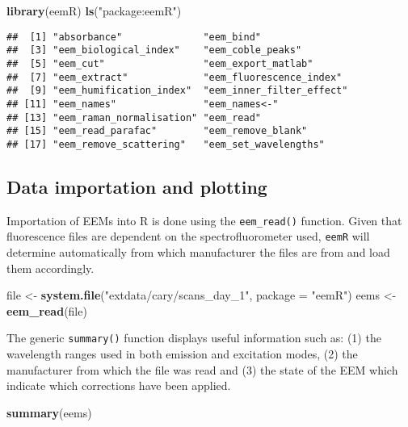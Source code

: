 \documentclass[]{book}
\newenvironment{Shaded}{\begin{snugshade}}{\end{snugshade}}
\newcommand{\KeywordTok}[1]{\textcolor[rgb]{0.13,0.29,0.53}{\textbf{{#1}}}}
\newcommand{\DataTypeTok}[1]{\textcolor[rgb]{0.13,0.29,0.53}{{#1}}}
\newcommand{\StringTok}[1]{\textcolor[rgb]{0.31,0.60,0.02}{{#1}}}
\newcommand{\NormalTok}[1]{{#1}}
\begin{document}
\begin{Shaded}
\begin{Highlighting}[]
\KeywordTok{library}\NormalTok{(eemR)}
\KeywordTok{ls}\NormalTok{(}\StringTok{"package:eemR"}\NormalTok{)}
\end{Highlighting}
\end{Shaded}

\begin{verbatim}
##  [1] "absorbance"              "eem_bind"               
##  [3] "eem_biological_index"    "eem_coble_peaks"        
##  [5] "eem_cut"                 "eem_export_matlab"      
##  [7] "eem_extract"             "eem_fluorescence_index" 
##  [9] "eem_humification_index"  "eem_inner_filter_effect"
## [11] "eem_names"               "eem_names<-"            
## [13] "eem_raman_normalisation" "eem_read"               
## [15] "eem_read_parafac"        "eem_remove_blank"       
## [17] "eem_remove_scattering"   "eem_set_wavelengths"
\end{verbatim}

\subsection{Data importation and
plotting}\label{data-importation-and-plotting}

Importation of EEMs into R is done using the \texttt{eem\_read()}
function. Given that fluorescence files are dependent on the
spectrofluorometer used, \texttt{eemR} will determine automatically from
which manufacturer the files are from and load them accordingly.

\begin{Shaded}
\begin{Highlighting}[]
\NormalTok{file <-}\StringTok{ }\KeywordTok{system.file}\NormalTok{(}\StringTok{"extdata/cary/scans_day_1"}\NormalTok{, }\DataTypeTok{package =} \StringTok{"eemR"}\NormalTok{)}
\NormalTok{eems <-}\StringTok{ }\KeywordTok{eem_read}\NormalTok{(file)}
\end{Highlighting}
\end{Shaded}

The generic \texttt{summary()} function displays useful information such
as: (1) the wavelength ranges used in both emission and excitation
modes, (2) the manufacturer from which the file was read and (3) the
state of the EEM which indicate which corrections have been applied.

\begin{Shaded}
\begin{Highlighting}[]
\KeywordTok{summary}\NormalTok{(eems)}
\end{Highlighting}
\end{Shaded}
\end{document}

